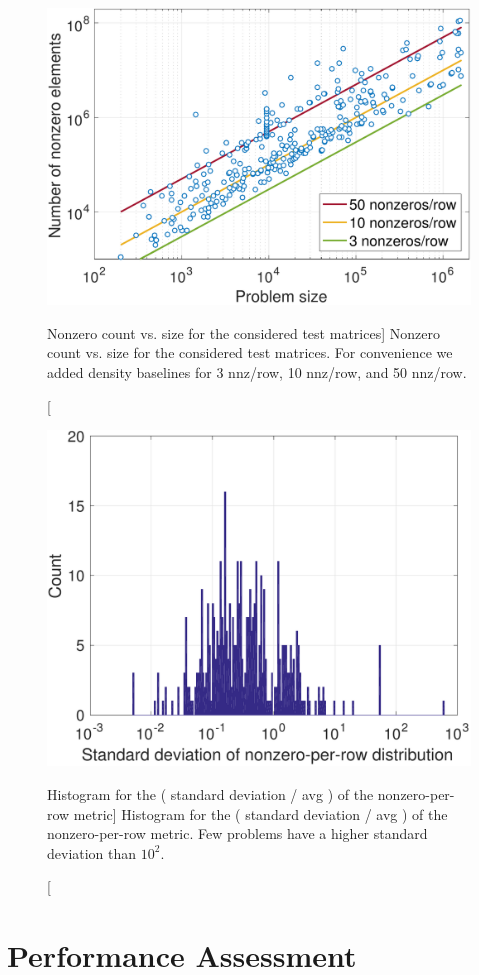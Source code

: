 \begin{figure}[t]
\begin{center}
\includegraphics[width=.5\columnwidth]{plots/matrixchar_nnz}
\end{center}
\caption
[Nonzero count vs. size for the considered test matrices]
{Nonzero count vs. size for the considered test matrices. 
For convenience we added density baselines for 3 nnz/row, 10 nnz/row, and 50 nnz/row.
}
\label{2017-coo-spmv:fig:matrixnnz}
\end{figure}


\begin{figure}[t]
\begin{center}
\includegraphics[width=.5\columnwidth]{plots/matrixchar_std_avg_logy}
\end{center}
\caption
[Histogram for the ( standard deviation / avg ) of the nonzero-per-row metric]
{Histogram for the ( standard deviation / avg ) of the nonzero-per-row metric. Few problems have a higher standard deviation than $10^2$.}
\label{2017-coo-spmv:fig:matrixstd}
\end{figure}

\section{Performance Assessment}
\label{2017-coo-spmv:s4-experiments}


